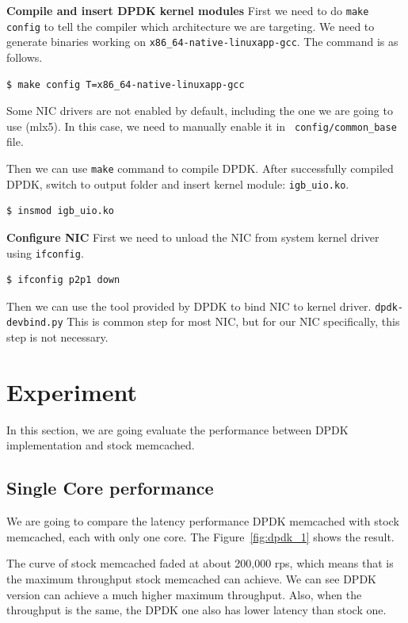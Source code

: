 \documentclass[bsc,frontabs,twoside,singlespacing,parskip,deptreport]{infthesis}     %
\begin{document}

\textbf{Compile and insert DPDK kernel modules} First we need to do \texttt{make config} to tell the compiler which architecture we are targeting. We need to generate binaries working on \texttt{x86\_64-native-linuxapp-gcc}. The command is as follows.


\begin{verbatim}
$ make config T=x86_64-native-linuxapp-gcc
\end{verbatim}


Some NIC drivers are not enabled by default, including the one we are going to use (mlx5). In this case, we need to manually enable it in \texttt{ config/common\_base} file.

Then we can use \texttt{make} command to compile DPDK. After successfully compiled DPDK, switch to output folder and insert kernel module: \texttt{igb\_uio.ko}.

\begin{verbatim}
$ insmod igb_uio.ko
\end{verbatim}


\textbf{Configure NIC} First we need to unload the NIC from system kernel driver using \texttt{ifconfig}. 

\begin{verbatim}
$ ifconfig p2p1 down
\end{verbatim}

 Then we can use the tool provided by DPDK to bind NIC to kernel driver. \texttt{dpdk-devbind.py} This is common step for most NIC, but for our NIC specifically, this step is not necessary.

\section{Experiment}
In this section, we are going evaluate the performance between DPDK implementation and stock memcached.

\subsection{Single Core performance}
We are going to compare the latency performance DPDK memcached with stock memcached, each with only one core. The Figure~\ref{fig:dpdk_1} shows the result. 

The curve of stock memcached faded at about 200,000 rps, which means that is the maximum throughput stock memcached can achieve. We can see DPDK version can achieve a much higher maximum throughput. Also, when the throughput is the same, the DPDK one also has lower latency than stock one.
\end{document}
